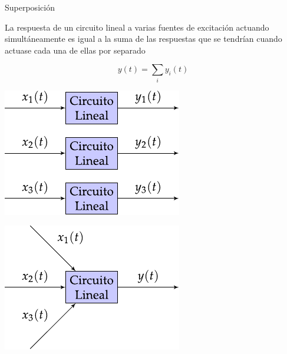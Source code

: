 \documentclass[aspectratio=169, xcolor={usenames,svgnames,dvipsnames}]{beamer}
\begin{document}

\begin{frame}{Superposición}

    \vspace{3mm}
    La respuesta de un \alert{circuito lineal} a varias fuentes de excitación actuando simultáneamente es igual a la \alert{suma de las respuestas} que se tendrían cuando actuase cada una de ellas por separado

    \vspace{-2mm}
    \[
        y(t) = \sum_i y_i(t)
    \]

    \begin{minipage}[c]{0.45\linewidth}
        \begin{center}
            \includegraphics[width=0.88\linewidth]{../figs/superposicion2.pdf}
        \end{center}
    \end{minipage}
    \hfill%
    \begin{minipage}[c]{0.45\linewidth}
        \begin{center}
            \includegraphics[width=0.95\linewidth]{../figs/superposicion.pdf}
        \end{center}
    \end{minipage}
\end{frame}
\end{document}
